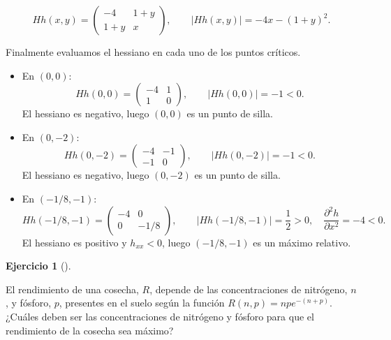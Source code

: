 \documentclass[
  spanish,
  a4paper,
]{scrreport}
\theoremstyle{definition}
\newtheorem{exercise}{Ejercicio}[chapter]
\theoremstyle{remark}
\begin{document}
\begin{tcolorbox}
\[
Hh(x,y)=\begin{pmatrix}
-4 & 1+y\\
1+y & x
\end{pmatrix},\qquad
|Hh(x,y)|=-4x-(1+y)^2.
\]

Finalmente evaluamos el hessiano en cada uno de los puntos críticos.

\begin{itemize}
\item
  En \((0,0)\): \[
  Hh(0,0)=\begin{pmatrix}-4 & 1\\ 1 & 0\end{pmatrix},\qquad
  |Hh(0,0)|=-1<0.
  \] El hessiano es negativo, luego \((0,0)\) es un punto de silla.
\item
  En \((0,-2)\): \[
  Hh(0,-2)=\begin{pmatrix}-4 & -1\\ -1 & 0\end{pmatrix},\qquad
  |Hh(0,-2)|=-1<0.
  \] El hessiano es negativo, luego \((0,-2)\) es un punto de silla.
\item
  En \((-1/8,-1)\): \[
  Hh(-1/8,-1)=\begin{pmatrix}-4 & 0\\ 0 & -1/8\end{pmatrix},\qquad
  |Hh(-1/8,-1)|=\frac{1}{2}>0,\quad \frac{\partial^2 h}{\partial x^2}=-4<0.
  \] El hessiano es positivo y \(h_{xx}<0\), luego \((-1/8,-1)\) es un
  máximo relativo.
\end{itemize}

\end{tcolorbox}

\begin{exercise}[]\protect\hypertarget{exr-extremos-cosecha}{}\label{exr-extremos-cosecha}

El rendimiento de una cosecha, \(R\), depende de las concentraciones de
nitrógeno, \(n\), y fósforo, \(p\), presentes en el suelo según la
función \(R(n,p) = npe^{-(n+p)}\). ¿Cuáles deben ser las concentraciones
de nitrógeno y fósforo para que el rendimiento de la cosecha sea máximo?

\end{exercise}
\end{document}
